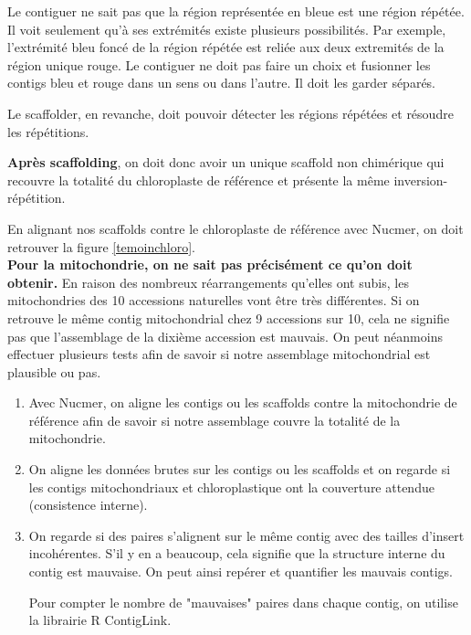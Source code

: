 \documentclass[a4paper]{article}
\begin{document}
Le contiguer ne sait pas que la région représentée en bleue est une région répétée. Il voit seulement qu'à ses extrémités existe plusieurs possibilités. Par exemple, l'extrémité bleu foncé de la région répétée est reliée aux deux extremités de la région unique rouge. Le contiguer ne doit pas faire un choix et fusionner les contigs bleu et rouge dans un sens ou dans l'autre. Il doit les garder séparés. 

Le scaffolder, en revanche, doit pouvoir détecter les régions répétées et résoudre les répétitions. 

\textbf{Après scaffolding}, on doit donc avoir un unique scaffold non chimérique qui recouvre la totalité du chloroplaste de référence et présente la même inversion-répétition. 

En alignant nos scaffolds contre le chloroplaste de référence avec Nucmer, on doit retrouver la figure \ref{temoinchloro}. \\

\textbf{Pour la mitochondrie, on ne sait pas précisément ce qu'on doit obtenir.} En raison des nombreux réarrangements qu'elles ont subis, les mitochondries des 10 accessions naturelles vont être très différentes. \cite{arrieta2009diversity} Si on retrouve le même contig mitochondrial chez 9 accessions sur 10, cela ne signifie pas que l'assemblage de la dixième accession est mauvais. On peut néanmoins effectuer plusieurs tests afin de savoir si notre assemblage mitochondrial est plausible ou pas. 

\begin{enumerate}
\item Avec Nucmer, on aligne les contigs ou les scaffolds contre la mitochondrie de référence afin de savoir si notre assemblage couvre la totalité de la mitochondrie. 

\item On aligne les données brutes sur les contigs ou les scaffolds et on regarde si les contigs mitochondriaux et chloroplastique ont la couverture attendue (consistence interne).

\item On regarde si des paires s'alignent sur le même contig avec des tailles d'insert incohérentes. S'il y en a beaucoup, cela signifie que la structure interne du contig est mauvaise. On peut ainsi repérer et quantifier les mauvais contigs.

Pour compter le nombre de "mauvaises" paires dans chaque contig, on utilise la librairie R ContigLink. 

\end{enumerate}
\end{document}
